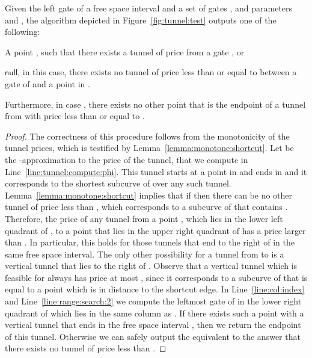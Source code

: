 \documentclass[12pt]{article}
\newcommand{\lemlab}[1]{\label{lemma:#1}}
\newcommand{\lemref}[1]{Lemma~\ref{lemma:#1}}
\newcommand{\figref}[1]{Figure~\ref{fig:#1}}
\newcommand{\lineref}[1]{Line~\ref{line:#1}}
\newcommand{\NULL}{\ensuremath{\mathsf{null}}}
\numberwithin{figure}{section}
\numberwithin{equation}{section}
\begin{document}
\begin{lemma}\lemlab{tunnel:test}Given the left gate  of a free space interval
     and a set of gates , and parameters
     and , the algorithm 
    depicted in \figref{tunnel:test} outputs one of the following:
    \begin{compactenum}[(i)]
        \item A point , such that there
        exists a tunnel  of price
         from a gate
        , or
        
        \item \NULL, in this case, there exists no tunnel of price
        less than or equal to  between a gate of 
        and a point in .
    \end{compactenum}
    Furthermore, in case , there exists no other point  that is the endpoint of a tunnel from 
    with price less than or equal to .
\end{lemma}
\begin{proof}
    The correctness of this procedure follows from the monotonicity of
    the tunnel prices, which is testified by
    \lemref{monotone:shortcut}.  Let  be the
    -approximation to the price of the tunnel, that we
    compute in \lineref{tunnel:compute:phi}.  This tunnel starts at a
    point in  and ends in  and it corresponds to the
    shortest subcurve  of  over any such tunnel.
    \lemref{monotone:shortcut} implies that if  then
    there can be no other tunnel of price less than , which
    corresponds to a subcurve of  that contains .
    Therefore, the price of any tunnel from a point , which lies in the lower left quadrant of , to a
    point that lies in the upper right quadrant of  has a price
    larger than . In particular, this holds for those tunnels
    that end to the right of  in the same free space interval.
    The only other possibility for a tunnel from  to
     is a vertical tunnel that lies to the right of
    .  Observe that a vertical tunnel which is feasible for
     always has price at most , since it corresponds
    to a subcurve of  that is equal to a point which is in
    distance  to the shortcut edge.  In \lineref{col:index}
    and \lineref{range:search:2} we compute the leftmost gate of
     in the lower right quadrant of  which lies in the
    same column as . If there exists such a point with a
    vertical tunnel that ends in the free space interval
    , then we return the endpoint of this tunnel.
    Otherwise we can safely output the equivalent to the answer that
    there exists no tunnel of price less than .
\end{proof}
\end{document}
